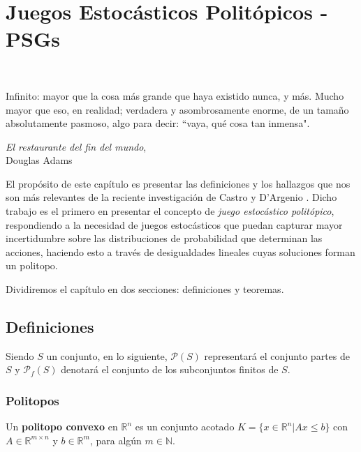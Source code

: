\chapter{Juegos Estocásticos Politópicos - PSGs}
~\label{cap:psg}
\vspace{-1cm}
\epigraph{Infinito: mayor que la cosa más grande que haya existido nunca, y más. Mucho mayor que eso, en realidad; verdadera y asombrosamente enorme, de un tamaño absolutamente pasmoso, algo para decir: ``vaya, qué cosa tan inmensa".}{\textit{El restaurante del fin del mundo}, \\ Douglas Adams}

El propósito de este capítulo es presentar las definiciones y los hallazgos que
nos son más relevantes de la reciente investigación de Castro y D'Argenio
\cite{Polytopal}. Dicho trabajo es el primero en presentar el concepto de
\textit{juego estocástico politópico}, respondiendo a la necesidad de juegos
estocásticos que puedan capturar mayor incertidumbre sobre las distribuciones
de probabilidad que determinan las acciones, haciendo esto a través de
desigualdades lineales cuyas soluciones forman un politopo.


Dividiremos el capítulo en dos secciones: definiciones y teoremas.

\section{Definiciones}

Siendo $S$ un conjunto, en lo siguiente, $\mathscr{P}(S)$ representará el
conjunto partes de $S$ y $\mathscr{P}_f(S)$ denotará el conjunto de los
subconjuntos finitos de $S$.

\subsection*{Politopos}

Un \textbf{politopo convexo} en $\mathbb{R}^n$ es un conjunto acotado $K = \{ x
	\in \mathbb{R}^n | Ax \leq b\}$ con $A \in \mathbb{R}^{m\times n}$ y $ b \in
	\mathbb{R}^m$, para algún $m \in \mathbb{N}$.

